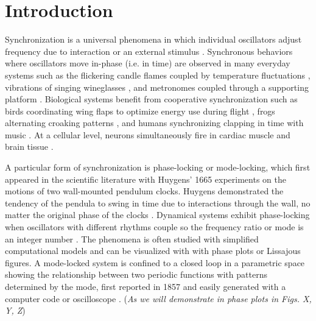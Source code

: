 \documentclass[twocolumn,preprintnumbers,amsmath,amssymb,aps,prx]{revtex4}
\begin{document}
\maketitle %

\section{Introduction} %
%
Synchronization is a universal phenomena
in which individual oscillators adjust frequency due
to interaction or an external stimulus \cite{Pikovsky2003}.
Synchronous behaviors where oscillators move in-phase (i.e. in time)
are observed
in many everyday systems
such as the
flickering candle flames coupled by temperature fluctuations \cite{Okamoto2016},
vibrations of singing wineglasses \cite{Arane2009}, 
and metronomes coupled through a supporting platform \cite{Jia2015}.
Biological systems benefit from cooperative
synchronization such as 
birds coordinating wing flaps
to optimize energy use during flight \cite{Portugal2014},
frogs alternating croaking patterns \cite{Aihara2014},
and humans synchronizing clapping in time with music \cite{Tranchant2016}.
At a cellular level, 
neurons simultaneously fire in cardiac muscle \cite{MartinHall1999}
and brain tissue \cite{Singer1999}.

A particular form of 
synchronization is phase-locking or mode-locking,
which first appeared in the scientific literature
with 
Huygens' 1665 experiments on
the 
motions of two wall-mounted pendulum clocks.
Huygens demonstrated the tendency of
the pendula 
to swing in time %
due to interactions through the wall,  
no matter the original phase of the clocks \cite{Bennett2002}.
Dynamical systems %
exhibit phase-locking 
when oscillators with different rhythms couple
so the frequency ratio or mode 
is an integer number \cite{Bak1986}.
The phenomena 
is often studied with simplified computational models
and can be visualized with %
with phase plots or Lissajous figures.
A mode-locked system is confined to 
a closed loop in a 
parametric space showing the relationship between two periodic functions
with patterns determined by the mode, %
first reported in 1857 \cite{Lissajous1857}
and easily generated with a computer code 
or oscilloscope \cite{Tong1997}. 
({\it As we will demonstrate in phase plots in Figs. X, Y, Z})
\end{document}
